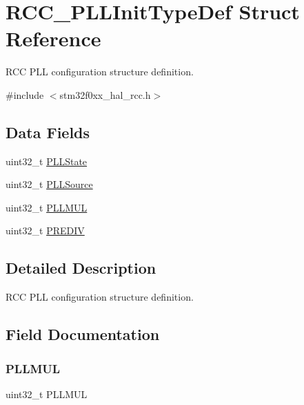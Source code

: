 \hypertarget{struct_r_c_c___p_l_l_init_type_def}{}\section{R\+C\+C\+\_\+\+P\+L\+L\+Init\+Type\+Def Struct Reference}
\label{struct_r_c_c___p_l_l_init_type_def}


R\+CC P\+LL configuration structure definition.  




{\ttfamily \#include $<$stm32f0xx\+\_\+hal\+\_\+rcc.\+h$>$}

\subsection*{Data Fields}
\begin{DoxyCompactItemize}
\item 
uint32\+\_\+t \hyperlink{struct_r_c_c___p_l_l_init_type_def_ab3bb33f461bb409576e1c899c962e0b0}{P\+L\+L\+State}
\item 
uint32\+\_\+t \hyperlink{struct_r_c_c___p_l_l_init_type_def_a418ecda4a355c6a161e4893a7bc1897f}{P\+L\+L\+Source}
\item 
uint32\+\_\+t \hyperlink{struct_r_c_c___p_l_l_init_type_def_a4a57e48e8e939695ff2a76456e6360ef}{P\+L\+L\+M\+UL}
\item 
uint32\+\_\+t \hyperlink{struct_r_c_c___p_l_l_init_type_def_a0b568dda5046e1a2f02180f20f105aed}{P\+R\+E\+D\+IV}
\end{DoxyCompactItemize}


\subsection{Detailed Description}
R\+CC P\+LL configuration structure definition. 

\subsection{Field Documentation}
\mbox{\label{struct_r_c_c___p_l_l_init_type_def_a4a57e48e8e939695ff2a76456e6360ef}} 
\subsubsection{\texorpdfstring{P\+L\+L\+M\+UL}{PLLMUL}}
{\footnotesize\ttfamily uint32\+\_\+t P\+L\+L\+M\+UL}

